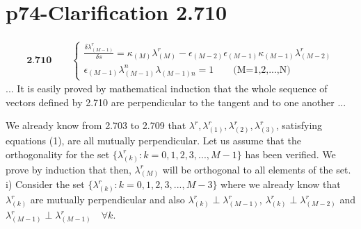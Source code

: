 \section{p74-Clarification 2.710}
\begin{tcolorbox}
\begin{align}
\textbf{2.710}\quad\quad\left \{ \begin{array}{c}
\frac{\delta\lambda_{(M-1)}^r}{\delta s} = \kappa_{(M)}\lambda^r_{(M)} - \epsilon_{(M-2)}\epsilon_{(M-1)}\kappa_{(M-1)}\lambda^r_{(M-2)}\\
\epsilon_{(M-1)}\lambda^n_{(M-1)}\lambda_{(M-1)n} = 1\quad\quad \text{(M=1,2,...,N)}
\end{array} \right.
\end{align}
... It is easily proved by mathematical induction that the whole sequence of vectors defined by 2.710 are perpendicular to the tangent and to one another ...
\end{tcolorbox}
We already know from 2.703 to 2.709 that $\lambda^r, \lambda_{(1)}^r,\lambda_{(2)}^r,\lambda_{(3)}^r$, satisfying equations (1), are all mutually perpendicular. Let us assume that the orthogonality for the set $\{\lambda_{(k)}^r:k= 0,1,2,3,..., M-1\}$ has been verified. We prove by induction that then, $\lambda_{(M)}^r$ will be orthogonal to all elements of the set.\\
i) Consider the set $\{\lambda_{(k)}^r:k= 0,1,2,3,..., M-3\}$ where we already know that $\lambda_{(k)}^r$ are mutually perpendicular and also $\lambda_{(k)}^r \perp \lambda_{(M-1)}^r $, $\lambda_{(k)}^r \perp \lambda_{(M-2)}^r$ and $\lambda_{(M-1)}^r \perp \lambda_{(M-1)}^r \quad \forall k$.
